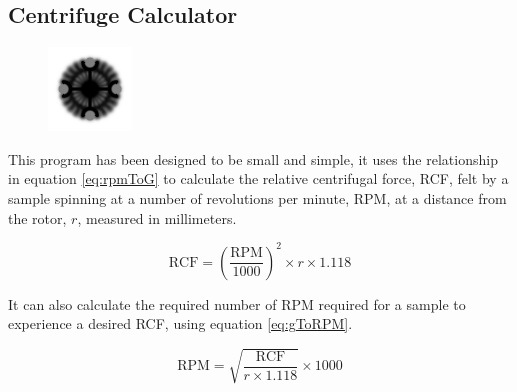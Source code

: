 \documentclass[a4paper]{article}
\begin{document}
	\pagestyle{fancy}
	\renewcommand{\headrulewidth}{0pt}
	\renewcommand{\footrulewidth}{0.4pt}
	\renewcommand{\subsectionmark}[1]{}
	\renewcommand{\sectionmark}[1]{\markboth{#1}{}}
	\rfoot{\thepage}
	\doublespacing

	\begin{centering}
 		\section*{Centrifuge Calculator}
 		\label{sec:centrifuge_calculator}
	\end{centering} 	

		\begin{figure}[ht!]
			\centering
			\includegraphics[height=6em]{Graphics/CentrifugeIcon}
		\end{figure}

		\noindent This program has been designed to be small and simple, it uses the relationship in equation \ref{eq:rpmToG} to calculate the relative centrifugal force, RCF, felt by a sample spinning at a number of revolutions per minute, RPM, at a distance from the rotor, $r$, measured in millimeters.

		\begin{equation}
			\text{RCF} = \left( \frac{\text{RPM}}{1000} \right) ^{2} \times r \times 1.118
			\label{eq:rpmToG}
		\end{equation}

		\noindent It can also calculate the required number of RPM required for a sample to experience a desired RCF, using equation \ref{eq:gToRPM}.

		\begin{equation}
			\text{RPM} = \sqrt{\frac{\text{RCF}}{r \times 1.118}} \times 1000
			\label{eq:gToRPM}
		\end{equation}
\end{document}
